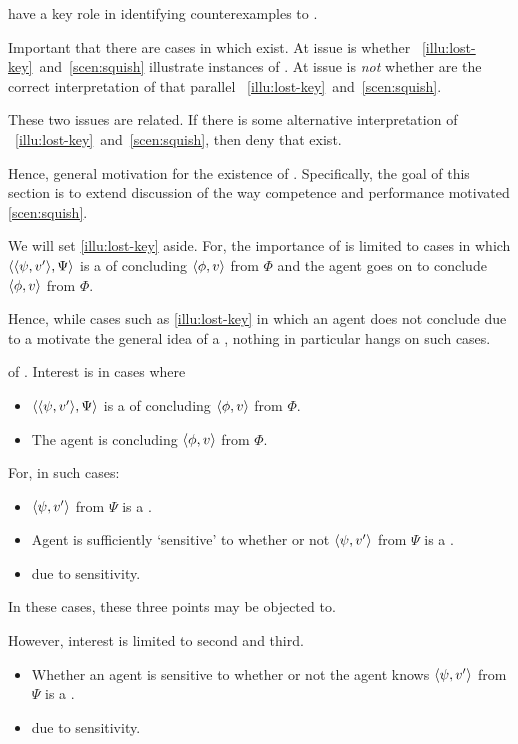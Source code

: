 \begin{note}
   have a key role in identifying counterexamples to \issueConstraint{}.

  Important that there are cases in which  exist.
  At issue is whether ~\ref{illu:lost-key}~and~\ref{scen:squish} illustrate instances of .
  At issue is \emph{not} whether  are the correct interpretation of  that parallel ~\ref{illu:lost-key}~and~\ref{scen:squish}.

  These two issues are related.
  If there is some alternative interpretation of ~\ref{illu:lost-key}~and~\ref{scen:squish}, then deny that  exist.

  Hence, general motivation for the existence of \requ{}.
  Specifically, the goal of this section is to extend discussion of the way competence and performance motivated \autoref{scen:squish}.

  We will set \autoref{illu:lost-key} aside.
  For, the importance of  is limited to cases in which \(\langle \langle \psi, v' \rangle, \Psi \rangle\) is a  of concluding \(\langle \phi, v \rangle\) from \(\Phi\) and the agent goes on to conclude \(\langle \phi, v \rangle\) from \(\Phi\).

  Hence, while cases such as \autoref{illu:lost-key} in which an agent does not conclude due to a \requ{} motivate the general idea of a \requ{}, nothing in particular hangs on such cases.
\end{note}

\begin{note}
   of .
  Interest is in cases where

  \begin{itemize}
  \item
    \(\langle \langle \psi, v' \rangle, \Psi \rangle\) is a \requ{} of concluding \(\langle \phi, v \rangle\) from \(\Phi\).
  \item
    The agent is concluding \(\langle \phi, v \rangle\) from \(\Phi\).
  \end{itemize}
  For, in such cases:
  \begin{itemize}
  \item
    \(\langle \psi, v' \rangle\) from \(\Psi\) is a \fc{}.
  \item
    Agent is sufficiently `sensitive' to whether or not \(\langle \psi, v' \rangle\) from \(\Psi\) is a \fc{}.
  \item
    \ninf{} due to sensitivity.
  \end{itemize}
  In these cases, these three points may be objected to.

  However, interest is limited to second and third.

  \begin{itemize}
  \item
    Whether an agent is sensitive to whether or not the agent knows \(\langle \psi, v' \rangle\) from \(\Psi\) is a \fc{}.
  \item
     due to sensitivity.
  \end{itemize}
\end{note}

